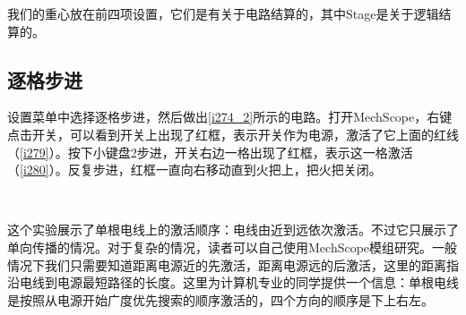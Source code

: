 我们的重心放在前四项设置，它们是有关于电路结算的，其中Stage是关于逻辑结算的。

\subsection{逐格步进}
设置菜单中选择逐格步进，然后做出\autoref{i274_2}所示的电路。打开MechScope，右键点击开关，可以看到开关上出现了红框，表示开关作为电源，激活了它上面的红线（\autoref{i279}）。按下小键盘2步进，开关右边一格出现了红框，表示这一格激活（\autoref{i280}）。反复步进，红框一直向右移动直到火把上，把火把关闭。
\begin{figure}
\begin{center}
\\
\qquad
{}
\qquad
{}
\qquad
{}
\qquad
{}
\qquad
{}
\end{center}
\caption{}
\end{figure}

这个实验展示了单根电线上的激活顺序：电线由近到远依次激活。不过它只展示了单向传播的情况。对于复杂的情况，读者可以自己使用MechScope模组研究。一般情况下我们只需要知道距离电源近的先激活，距离电源远的后激活，这里的距离指沿电线到电源最短路径的长度。这里为计算机专业的同学提供一个信息：单根电线是按照从电源开始广度优先搜索的顺序激活的，四个方向的顺序是下上右左。

